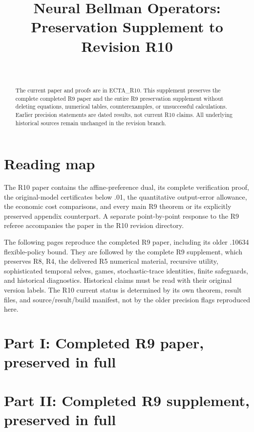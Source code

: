 \documentclass[ecta]{econsocart}
\begin{document}
\begin{frontmatter}
\title{Neural Bellman Operators: Preservation Supplement to Revision R10}
\begin{aug}
\author[id=au1,addressref={add1}]{~}
\address[id=add1]{}
\end{aug}
\begin{abstract}
The current paper and proofs are in ECTA\_R10. This supplement preserves the complete completed R9 paper and the entire R9 preservation supplement without deleting equations, numerical tables, counterexamples, or unsuccessful calculations. Earlier precision statements are dated results, not current R10 claims. All underlying historical sources remain unchanged in the revision branch.
\end{abstract}
\end{frontmatter}
\section*{Reading map}
The R10 paper contains the affine-preference dual, its complete verification proof, the original-model certificates below .01, the quantitative output-error allowance, the economic cost comparisons, and every main R9 theorem or its explicitly preserved appendix counterpart. A separate point-by-point response to the R9 referee accompanies the paper in the R10 revision directory.

The following pages reproduce the completed R9 paper, including its older .10634 flexible-policy bound. They are followed by the complete R9 supplement, which preserves R8, R4, the delivered R5 numerical material, recursive utility, sophisticated temporal selves, games, stochastic-trace identities, finite safeguards, and historical diagnostics. Historical claims must be read with their original version labels. The R10 current status is determined by its own theorem, result files, and source/result/build manifest, not by the older precision flags reproduced here.

\section*{Part I: Completed R9 paper, preserved in full}

\section*{Part II: Completed R9 supplement, preserved in full}

\end{document}
